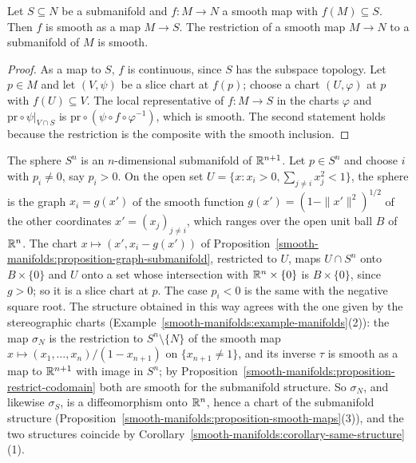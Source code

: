 \begin{proposition}\label{smooth-manifolds:proposition-restrict-codomain}
Let $S \subseteq N$ be a submanifold and $f \colon M \to N$ a smooth map with $f(M) \subseteq S$. Then $f$ is smooth as a map $M \to S$. The restriction of a
smooth map $M \to N$ to a submanifold of $M$ is smooth.
\end{proposition}

\begin{proof}
As a map to $S$, $f$ is continuous, since $S$ has the subspace topology. Let $p \in M$ and let $(V, \psi)$ be a slice chart at $f(p)$; choose a chart
$(U, \varphi)$ at $p$ with $f(U) \subseteq V$. The local representative of $f \colon M \to S$ in the charts $\varphi$ and $\mathrm{pr} \circ \psi|_{V \cap S}$ is
$\mathrm{pr} \circ (\psi \circ f \circ \varphi^{-1})$, which is smooth. The second statement holds because the restriction is the composite with the smooth
inclusion.
\end{proof}

\begin{example}\label{smooth-manifolds:example-sphere-submanifold}
The sphere $S^n$ is an $n$-dimensional submanifold of $\mathbb{R}^{n+1}$. Let $p \in S^n$ and choose $i$ with $p_i \neq 0$, say $p_i > 0$. On the open set
$U = \{x : x_i > 0, \sum_{j \neq i}x_j^2 < 1\}$, the sphere is the graph $x_i = g(x')$ of the smooth function $g(x') = (1 - \|x'\|^2)^{1/2}$ of the other
coordinates $x' = (x_j)_{j \neq i}$, which ranges over the open unit ball $B$ of $\mathbb{R}^n$. The chart $x \mapsto (x', x_i - g(x'))$ of
Proposition~\ref{smooth-manifolds:proposition-graph-submanifold}, restricted to $U$, maps $U \cap S^n$ onto $B \times \{0\}$ and $U$ onto a set whose
intersection with $\mathbb{R}^n \times \{0\}$ is $B \times \{0\}$, since $g > 0$; so it is a slice chart at $p$. The case $p_i < 0$ is the same with the negative
square root. The structure obtained in this way agrees with the one given by the stereographic charts
(Example~\ref{smooth-manifolds:example-manifolds}(2)): the map $\sigma_N$ is the restriction to $S^n \setminus \{N\}$ of the smooth map
$x \mapsto (x_1, \ldots, x_n)/(1 - x_{n+1})$ on $\{x_{n+1} \neq 1\}$, and its inverse $\tau$ is smooth as a map to $\mathbb{R}^{n+1}$ with image in $S^n$; by
Proposition~\ref{smooth-manifolds:proposition-restrict-codomain} both are smooth for the submanifold structure. So $\sigma_N$, and likewise $\sigma_S$, is a
diffeomorphism onto $\mathbb{R}^n$, hence a chart of the submanifold structure (Proposition~\ref{smooth-manifolds:proposition-smooth-maps}(3)), and the two structures
coincide by Corollary~\ref{smooth-manifolds:corollary-same-structure}(1).
\end{example}

